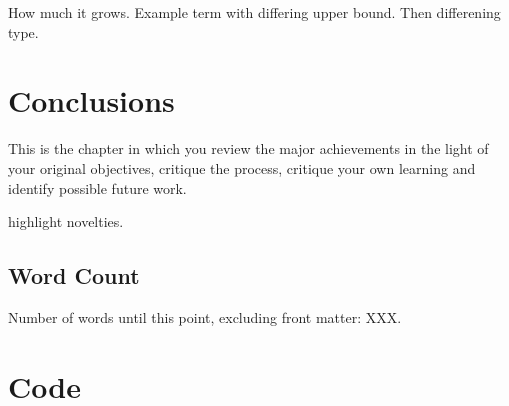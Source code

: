 \documentclass[12pt,a4paper]{report}
\theoremstyle{definition}
\theoremstyle{remark}
\begin{document}
How much it grows. Example term with differing upper bound. Then differening type.

\chapter{Conclusions}


This is the chapter in which you review the major achievements in the light of your original objectives, critique the process, critique your own learning and identify possible future work.

highlight novelties.

\vfill
\section{Word Count}
Number of words until this point, excluding front matter: XXX.



\appendix





\chapter{Code}
\end{document}
